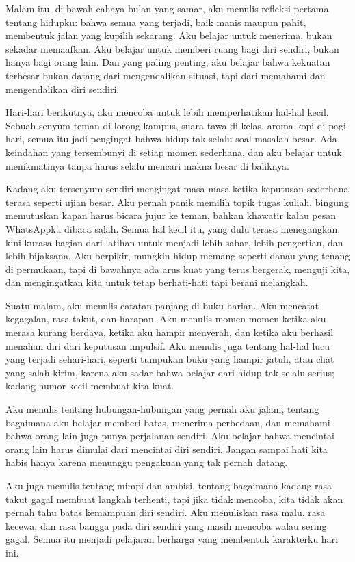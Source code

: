 \documentclass[
  letterpaper,
  DIV=11,
  numbers=noendperiod]{scrreprt}
\begin{document}
Malam itu, di bawah cahaya bulan yang samar, aku menulis refleksi
pertama tentang hidupku: bahwa semua yang terjadi, baik manis maupun
pahit, membentuk jalan yang kupilih sekarang. Aku belajar untuk
menerima, bukan sekadar memaafkan. Aku belajar untuk memberi ruang bagi
diri sendiri, bukan hanya bagi orang lain. Dan yang paling penting, aku
belajar bahwa kekuatan terbesar bukan datang dari mengendalikan situasi,
tapi dari memahami dan mengendalikan diri sendiri.

Hari-hari berikutnya, aku mencoba untuk lebih memperhatikan hal-hal
kecil. Sebuah senyum teman di lorong kampus, suara tawa di kelas, aroma
kopi di pagi hari, semua itu jadi pengingat bahwa hidup tak selalu soal
masalah besar. Ada keindahan yang tersembunyi di setiap momen sederhana,
dan aku belajar untuk menikmatinya tanpa harus selalu mencari makna
besar di baliknya.

Kadang aku tersenyum sendiri mengingat masa-masa ketika keputusan
sederhana terasa seperti ujian besar. Aku pernah panik memilih topik
tugas kuliah, bingung memutuskan kapan harus bicara jujur ke teman,
bahkan khawatir kalau pesan WhatsAppku dibaca salah. Semua hal kecil
itu, yang dulu terasa menegangkan, kini kurasa bagian dari latihan untuk
menjadi lebih sabar, lebih pengertian, dan lebih bijaksana. Aku
berpikir, mungkin hidup memang seperti danau yang tenang di permukaan,
tapi di bawahnya ada arus kuat yang terus bergerak, menguji kita, dan
mengingatkan kita untuk tetap berhati-hati tapi berani melangkah.

Suatu malam, aku menulis catatan panjang di buku harian. Aku mencatat
kegagalan, rasa takut, dan harapan. Aku menulis momen-momen ketika aku
merasa kurang berdaya, ketika aku hampir menyerah, dan ketika aku
berhasil menahan diri dari keputusan impulsif. Aku menulis juga tentang
hal-hal lucu yang terjadi sehari-hari, seperti tumpukan buku yang hampir
jatuh, atau chat yang salah kirim, karena aku sadar bahwa belajar dari
hidup tak selalu serius; kadang humor kecil membuat kita kuat.

Aku menulis tentang hubungan-hubungan yang pernah aku jalani, tentang
bagaimana aku belajar memberi batas, menerima perbedaan, dan memahami
bahwa orang lain juga punya perjalanan sendiri. Aku belajar bahwa
mencintai orang lain harus dimulai dari mencintai diri sendiri. Jangan
sampai hati kita habis hanya karena menunggu pengakuan yang tak pernah
datang.

Aku juga menulis tentang mimpi dan ambisi, tentang bagaimana kadang rasa
takut gagal membuat langkah terhenti, tapi jika tidak mencoba, kita
tidak akan pernah tahu batas kemampuan diri sendiri. Aku menuliskan rasa
malu, rasa kecewa, dan rasa bangga pada diri sendiri yang masih mencoba
walau sering gagal. Semua itu menjadi pelajaran berharga yang membentuk
karakterku hari ini.
\end{document}

